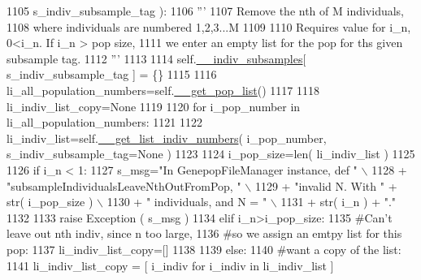 \begin{DoxyCode}
1105                                                     s\_indiv\_subsample\_tag ):
1106         \textcolor{stringliteral}{'''}
1107 \textcolor{stringliteral}{        Remove the nth of M individuals, }
1108 \textcolor{stringliteral}{        where individuals are numbered 1,2,3...M}
1109 \textcolor{stringliteral}{}
1110 \textcolor{stringliteral}{        Requires value for i\_n, 0<i\_n.  If i\_n > pop size,}
1111 \textcolor{stringliteral}{        we enter an empty list for the pop for ths given subsample tag.}
1112 \textcolor{stringliteral}{        '''}
1113 
1114         self.\hyperlink{classnegui_1_1genepopfilemanager_1_1GenepopFileManager_a1e8379bcee4902ca9314ff53fcb71644}{\_\_indiv\_subsamples}[ s\_indiv\_subsample\_tag ] = \{\}
1115 
1116         li\_all\_population\_numbers=self.\hyperlink{classnegui_1_1genepopfilemanager_1_1GenepopFileManager_a0cd3178624c652968b4d319f12e5df6e}{\_\_get\_pop\_list}()
1117         
1118         li\_indiv\_list\_copy=\textcolor{keywordtype}{None}
1119 
1120         \textcolor{keywordflow}{for} i\_pop\_number \textcolor{keywordflow}{in} li\_all\_population\_numbers:
1121 
1122             li\_indiv\_list=self.\hyperlink{classnegui_1_1genepopfilemanager_1_1GenepopFileManager_a4615769e9db90aa477aa3fd865408f54}{\_\_get\_list\_indiv\_numbers}( i\_pop\_number, 
      s\_indiv\_subsample\_tag=\textcolor{keywordtype}{None} )
1123 
1124             i\_pop\_size=len( li\_indiv\_list )
1125 
1126             \textcolor{keywordflow}{if}  i\_n < 1:
1127                 s\_msg=\textcolor{stringliteral}{"In GenepopFileManager instance, def "} \(\backslash\)
1128                         + \textcolor{stringliteral}{"subsampleIndividualsLeaveNthOutFromPop, "} \(\backslash\)
1129                         + \textcolor{stringliteral}{"invalid N.  With "} + str( i\_pop\_size ) \(\backslash\)
1130                         + \textcolor{stringliteral}{" individuals, and N = "} \(\backslash\)
1131                         + str( i\_n ) + \textcolor{stringliteral}{"."}
1132 
1133                 \textcolor{keywordflow}{raise} Exception ( s\_msg )
1134             \textcolor{keywordflow}{elif} i\_n>i\_pop\_size:
1135                 \textcolor{comment}{#Can't leave out nth indiv, since n too large,}
1136                 \textcolor{comment}{#so we assign an emtpy list for this pop:}
1137                 li\_indiv\_list\_copy=[]
1138 
1139             \textcolor{keywordflow}{else}:   
1140                 \textcolor{comment}{#want a copy of the list:}
1141                 li\_indiv\_list\_copy = [ i\_indiv \textcolor{keywordflow}{for} i\_indiv \textcolor{keywordflow}{in} li\_indiv\_list ]

\end{DoxyCode}
